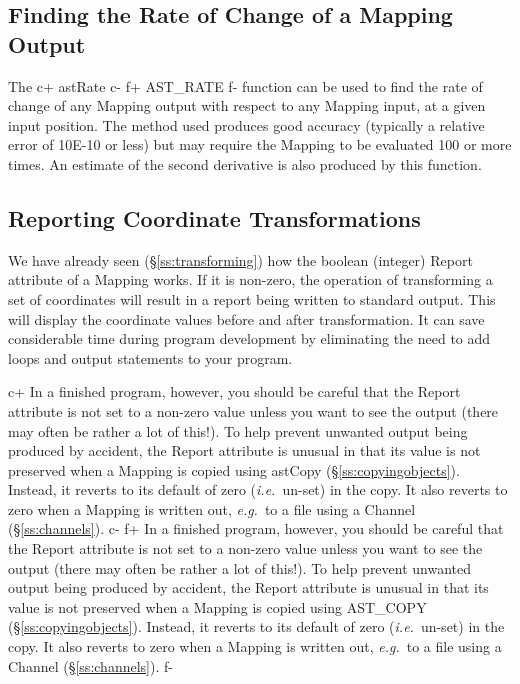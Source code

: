 \documentclass[twoside,11pt]{article}
\newcommand{\secref}[1]{\S\ref{#1}}
\newcommand{\secref}[1]{\ref{#1}}
\begin{document}
\subsection{Finding the Rate of Change of a Mapping Output}
The
c+
astRate
c-
f+
AST\_RATE
f-
function can be used to find the rate of change of any Mapping output
with respect to any Mapping input, at a given input position. The method
used produces good accuracy (typically a relative error of 10E-10 or
less) but may require the Mapping to be evaluated 100 or more times.
An estimate of the second derivative is also produced by this function.


\subsection{Reporting Coordinate Transformations}

We have already seen (\secref{ss:transforming}) how the boolean
(integer) Report attribute of a Mapping works. If it is non-zero, the
operation of transforming a set of coordinates will result in a report
being written to standard output. This will display the coordinate
values before and after transformation. It can save considerable time
during program development by eliminating the need to add loops and
output statements to your program.

c+
In a finished program, however, you should be careful that the Report
attribute is not set to a non-zero value unless you want to see the
output (there may often be rather a lot of this!). To help prevent
unwanted output being produced by accident, the Report attribute is
unusual in that its value is not preserved when a Mapping is copied
using astCopy (\secref{ss:copyingobjects}). Instead, it reverts to its
default of zero ({\em{i.e.}}\ un-set) in the copy. It also reverts to
zero when a Mapping is written out, {\em{e.g.}}\ to a file using a
Channel (\secref{ss:channels}).
c-
f+
In a finished program, however, you should be careful that the Report
attribute is not set to a non-zero value unless you want to see the
output (there may often be rather a lot of this!). To help prevent
unwanted output being produced by accident, the Report attribute is
unusual in that its value is not preserved when a Mapping is copied
using AST\_COPY (\secref{ss:copyingobjects}). Instead, it reverts to
its default of zero ({\em{i.e.}}\ un-set) in the copy. It also reverts
to zero when a Mapping is written out, {\em{e.g.}}\ to a file using a
Channel (\secref{ss:channels}).
f-
\end{document}
